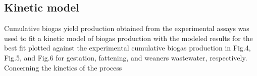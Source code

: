 \subsection{Kinetic model}
Cumulative biogas yield production obtained from the experimental assays was used to fit a kinetic model of biogas production with the modeled results for the best fit plotted against the experimental cumulative biogas production in Fig.4, Fig.5, and Fig.6 for gestation, fattening, and weaners wastewater, respectively.
Concerning the kinetics of the process